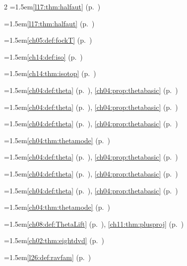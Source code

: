 \begin{multicols}{2}
\hangindent=1.5em\quad \ref{l17:thm:halfaut} (p.~\pageref{l17:thm:halfaut})\par
\hangindent=1.5em\quad \ref{l17:thm:halfaut} (p.~\pageref{l17:thm:halfaut})\par
\hangindent=1.5em\quad \ref{ch05:def:fockT} (p.~\pageref{ch05:def:fockT})\par
\hangindent=1.5em\quad \ref{ch14:def:iso} (p.~\pageref{ch14:def:iso})\par
\hangindent=1.5em\quad \ref{ch14:thm:isotop} (p.~\pageref{ch14:thm:isotop})\par
\hangindent=1.5em\quad \ref{ch04:def:theta} (p.~\pageref{ch04:def:theta}), \ref{ch04:prop:thetabasic} (p.~\pageref{ch04:prop:thetabasic})\par
\hangindent=1.5em\quad \ref{ch04:def:theta} (p.~\pageref{ch04:def:theta}), \ref{ch04:prop:thetabasic} (p.~\pageref{ch04:prop:thetabasic})\par
\hangindent=1.5em\quad \ref{ch04:def:theta} (p.~\pageref{ch04:def:theta}), \ref{ch04:prop:thetabasic} (p.~\pageref{ch04:prop:thetabasic})\par
\hangindent=1.5em\quad \ref{ch04:thm:thetamode} (p.~\pageref{ch04:thm:thetamode})\par
\hangindent=1.5em\quad \ref{ch04:def:theta} (p.~\pageref{ch04:def:theta}), \ref{ch04:prop:thetabasic} (p.~\pageref{ch04:prop:thetabasic})\par
\hangindent=1.5em\quad \ref{ch04:def:theta} (p.~\pageref{ch04:def:theta}), \ref{ch04:prop:thetabasic} (p.~\pageref{ch04:prop:thetabasic})\par
\hangindent=1.5em\quad \ref{ch04:def:theta} (p.~\pageref{ch04:def:theta}), \ref{ch04:prop:thetabasic} (p.~\pageref{ch04:prop:thetabasic})\par
\hangindent=1.5em\quad \ref{ch04:thm:thetamode} (p.~\pageref{ch04:thm:thetamode})\par
\hangindent=1.5em\quad \ref{ch08:def:ThetaLift} (p.~\pageref{ch08:def:ThetaLift}), \ref{ch11:thm:plusproj} (p.~\pageref{ch11:thm:plusproj})\par
\hangindent=1.5em\quad \ref{ch02:thm:eightdvd} (p.~\pageref{ch02:thm:eightdvd})\par
\hangindent=1.5em\quad \ref{l26:def:ravfam} (p.~\pageref{l26:def:ravfam})\par

\end{multicols}
